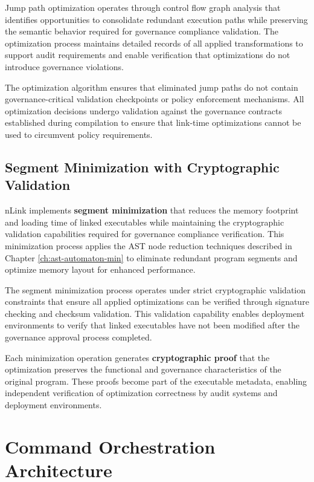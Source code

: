 Jump path optimization operates through control flow graph analysis that identifies opportunities to consolidate redundant execution paths while preserving the semantic behavior required for governance compliance validation. The optimization process maintains detailed records of all applied transformations to support audit requirements and enable verification that optimizations do not introduce governance violations.

The optimization algorithm ensures that eliminated jump paths do not contain governance-critical validation checkpoints or policy enforcement mechanisms. All optimization decisions undergo validation against the governance contracts established during compilation to ensure that link-time optimizations cannot be used to circumvent policy requirements.

\subsection{Segment Minimization with Cryptographic Validation}

nLink implements \textbf{segment minimization} that reduces the memory footprint and loading time of linked executables while maintaining the cryptographic validation capabilities required for governance compliance verification. This minimization process applies the AST node reduction techniques described in Chapter \ref{ch:ast-automaton-min} to eliminate redundant program segments and optimize memory layout for enhanced performance.

The segment minimization process operates under strict cryptographic validation constraints that ensure all applied optimizations can be verified through signature checking and checksum validation. This validation capability enables deployment environments to verify that linked executables have not been modified after the governance approval process completed.

Each minimization operation generates \textbf{cryptographic proof} that the optimization preserves the functional and governance characteristics of the original program. These proofs become part of the executable metadata, enabling independent verification of optimization correctness by audit systems and deployment environments.

\section{Command Orchestration Architecture}

